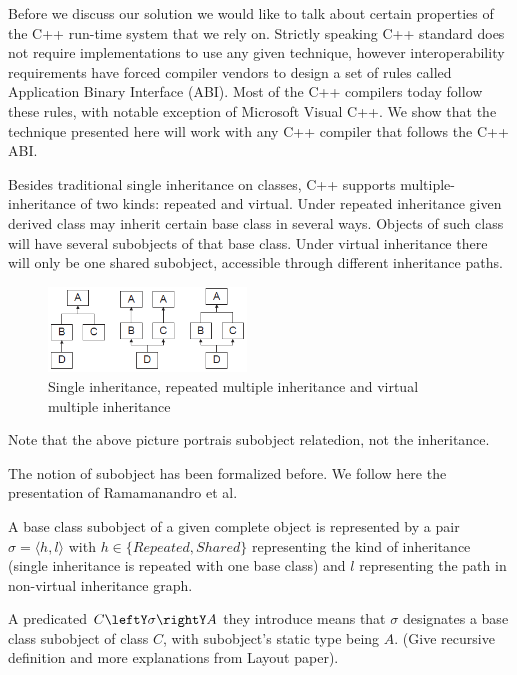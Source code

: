 \documentclass[preprint]{sigplanconf}
\begin{document}
Before we discuss our solution we would like to talk about certain properties of 
the C++ run-time system that we rely on. Strictly speaking C++ standard does not 
require implementations to use any given technique, however interoperability 
requirements have forced compiler vendors to design a set of rules called 
Application Binary Interface (ABI)\cite{C++ABI}. Most of the C++ compilers today 
follow these rules, with notable exception of Microsoft Visual C++. We show that 
the technique presented here will work with any C++ compiler that follows the 
C++ ABI.

Besides traditional single inheritance on classes, C++ supports 
multiple-inheritance of two kinds: repeated and virtual. Under repeated 
inheritance given derived class may inherit certain base class in several ways. 
Objects of such class will have several subobjects of that base class. Under 
virtual inheritance there will only be one shared subobject, accessible through 
different inheritance paths.

\begin{figure}[tbp]
  \centering
    \includegraphics[width=0.47\textwidth]{Hierarchies.png}
  \caption{Single inheritance, repeated multiple inheritance and virtual multiple inheritance}
  \label{fig:hierarchy}
\end{figure}

\noindent
Note that the above picture portrais subobject relatedion, not the inheritance.

The notion of subobject has been formalized before\cite{Rossie,Wasserrab,Ramamanandro}.
We follow here the presentation of Ramamanandro et al\cite{Rossie,Wasserrab,Ramamanandro}.

A base class subobject of a given complete object is represented by a pair 
$\sigma = \langle h,l\rangle$ with $h \in \{Repeated,Shared\}$ representing the 
kind of inheritance (single inheritance is repeated with one base class) and $l$ 
representing the path in non-virtual inheritance graph.

A predicated $C\leftY\sigma\rightY A$ they introduce means that $\sigma$ 
designates a base class subobject of class $C$, with subobject's static type 
being $A$. (Give recursive definition and more explanations from Layout paper).
\end{document}
